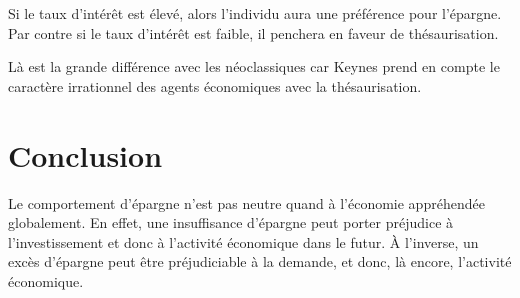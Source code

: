 \documentclass[10pt,a4paper,french]{article}
\begin{document}
Si le taux d'intérêt est élevé, alors l'individu aura une préférence pour l'épargne. Par contre si le taux
d'intérêt est faible, il penchera en faveur de thésaurisation.

Là est la grande différence avec les néoclassiques car Keynes prend en compte le caractère irrationnel des
agents économiques avec la thésaurisation.

\section*{Conclusion}
Le comportement d'épargne n'est pas neutre quand à l'économie appréhendée globalement. En effet, une insuffisance d'épargne peut porter préjudice à l'investissement et donc à l'activité économique dans le futur. À l'inverse, un excès d'épargne peut être préjudiciable à la demande, et donc, là encore, l'activité économique.

\appendix %

\printindex
\end{document}
